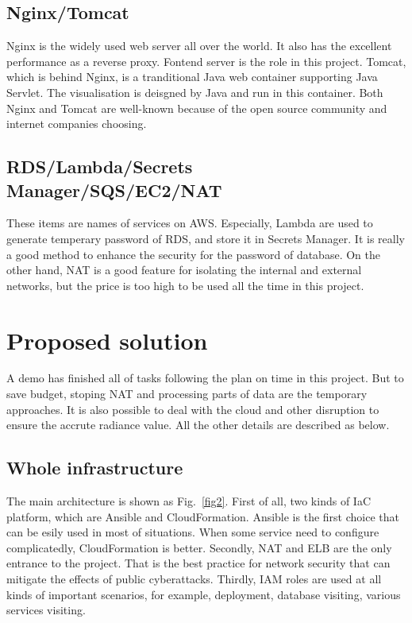 \documentclass[conference]{IEEEtran}
\begin{document}
	\subsection{Nginx/Tomcat}
	Nginx is the widely used web server all over the world. It also has the excellent performance as a reverse proxy. 
	Fontend server is the role in this project. Tomcat, which is behind Nginx, is a tranditional Java web container supporting 
	Java Servlet. The visualisation is deisgned by Java and run in this container. Both Nginx and Tomcat are well-known because of 
	the open source community and internet companies choosing.
	
	\subsection{RDS/Lambda/Secrets Manager/SQS/EC2/NAT}
	These items are names of services on AWS. Especially, Lambda are used to generate temperary password of RDS, and store it in 
	Secrets Manager. It is really a good method to enhance the security for the password of database. On the other hand, NAT is a 
	good feature for isolating the internal and external networks, but the price is too high to be used all the time in this project.
	
	\section{Proposed solution}
	
	A demo has finished all of tasks following the plan on time in this project. But to save budget, stoping NAT and processing parts of data are 
	the temporary approaches. It is also possible to deal with the cloud and other disruption to ensure the accrute radiance value. All the 
	other details are described as below.
	
	\subsection{Whole infrastructure}
	The main architecture is shown as Fig.~\ref{fig2}. First of all, two kinds of IaC platform, which are Ansible and CloudFormation.
	Ansible is the first choice that can be esily used in most of situations. When some service need to configure complicatedly, CloudFormation is 
	better. Secondly, NAT and ELB are the only entrance to the project. That is the best practice for network security that can mitigate the effects 
	of public cyberattacks. Thirdly, IAM roles are used at all kinds of important scenarios, for example, deployment, database visiting, various services visiting.
	
\end{document}
